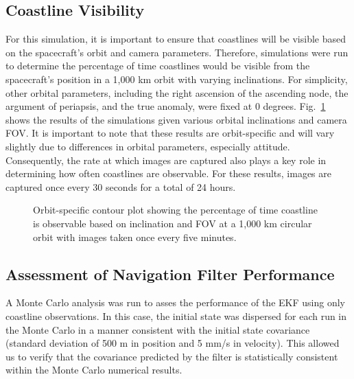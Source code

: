 \documentclass[]{aiaa-tc}%
\begin{document}
\subsection{Coastline Visibility}
For this simulation, it is important to ensure that coastlines will be visible based on the spacecraft's orbit and camera parameters.  Therefore, simulations were run to determine the percentage of time coastlines would be visible from the spacecraft's position in a 1,000 km orbit with varying inclinations.  For simplicity, other orbital parameters, including the right ascension of the ascending node, the argument of periapsis, and the true anomaly, were fixed at 0 degrees.  Fig.~\ref{fig:contourplot} shows the results of the simulations given various orbital inclinations and camera FOV.  It is important to note that these results are orbit-specific and will vary slightly due to differences in orbital parameters, especially attitude. Consequently, the rate at which images are captured also plays a key role in determining how often coastlines are observable.  For these results, images are captured once every 30 seconds for a total of 24 hours.
\begin{figure}[h!]
\centering
{} %
\caption{Orbit-specific contour plot showing the percentage of time coastline is observable based on inclination and FOV at a 1,000 km circular orbit with images taken once every five minutes.}
\label{fig:contourplot}
\end{figure}

\subsection{Assessment of Navigation Filter Performance}
A Monte Carlo analysis was run to asses the performance of the EKF using only coastline observations.  In this case, the initial state was dispersed for each run in the Monte Carlo in a manner consistent with the initial state covariance (standard deviation of 500 m in position and 5 mm/s in velocity).  This allowed us to verify that the covariance predicted by the filter is statistically consistent within the Monte Carlo numerical results.  
\end{document}
